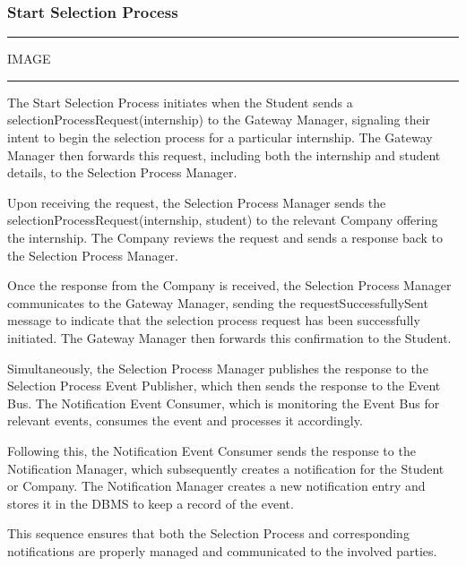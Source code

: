 \subsubsection{Start Selection Process}

\vspace{20pt}
\hrule
\vspace{10pt}
IMAGE
\vspace{10pt}
\hrule
\vspace{20pt}

The Start Selection Process initiates when the Student sends a selectionProcessRequest(internship) to the Gateway Manager, signaling their intent to begin the selection process for a particular internship. The Gateway Manager then forwards this request, including both the internship and student details, to the Selection Process Manager.

Upon receiving the request, the Selection Process Manager sends the selectionProcessRequest(internship, student) to the relevant Company offering the internship. The Company reviews the request and sends a response back to the Selection Process Manager. 

Once the response from the Company is received, the Selection Process Manager communicates to the Gateway Manager, sending the requestSuccessfullySent message to indicate that the selection process request has been successfully initiated. The Gateway Manager then forwards this confirmation to the Student.

Simultaneously, the Selection Process Manager publishes the response to the Selection Process Event Publisher, which then sends the response to the Event Bus. The Notification Event Consumer, which is monitoring the Event Bus for relevant events, consumes the event and processes it accordingly.

Following this, the Notification Event Consumer sends the response to the Notification Manager, which subsequently creates a notification for the Student or Company. The Notification Manager creates a new notification entry and stores it in the DBMS to keep a record of the event.

This sequence ensures that both the Selection Process and corresponding notifications are properly managed and communicated to the involved parties.

